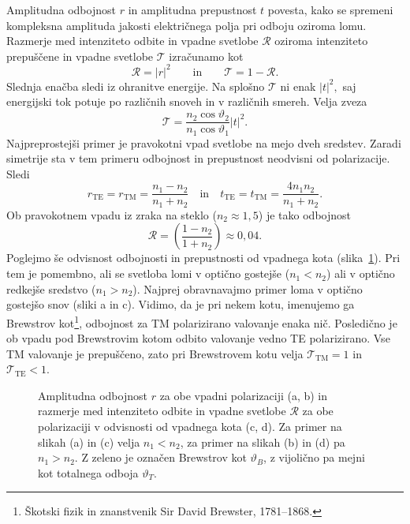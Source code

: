 Amplitudna odbojnost $r$ in amplitudna prepustnost $t$ povesta, kako se spremeni 
kompleksna amplituda jakosti električnega polja pri odboju oziroma lomu.
Razmerje med intenziteto odbite in vpadne svetlobe $\mathcal{R}$ oziroma intenziteto
prepuščene in vpadne svetlobe
$\mathcal{T}$ izračunamo kot 
\begin{equation}
\mathcal{R}=\left|r\right|^{2} \qquad \mathrm{in} \qquad \mathcal{T}=1-\mathcal{R}.
\end{equation}
Slednja enačba sledi iz ohranitve energije. Na splošno $\mathcal{T}$
ni enak $\left|t\right|^{2},$ saj energijski tok potuje po različnih
snoveh in v različnih smereh. Velja zveza
\begin{equation}
\mathcal{T}=\frac{n_{2}\cos\vartheta_{2}}{n_{1}\cos\vartheta_{1}}\left|t\right|^{2}.
\end{equation}
Najpreprostejši primer je pravokotni vpad svetlobe na mejo dveh sredstev. Zaradi simetrije 
sta v tem primeru odbojnost in prepustnost neodvisni od polarizacije. Sledi 
\begin{equation}
r_{\mathrm{TE}} = r_{\mathrm{TM}} = \frac{n_1-n_2}{n_1+n_2}
\quad \mathrm{in} \quad 
t_{\mathrm{TE}} = t_{\mathrm{TM}} = \frac{4n_1n_2}{n_1+n_2}. 
\end{equation}
Ob pravokotnem vpadu iz zraka na steklo ($n_2 \approx 1,5$) je tako odbojnost 
\begin{equation}
\mathcal{R} = \left(\frac{1-n_2}{1+n_2}\right) \approx 0,04.
\end{equation}
Poglejmo še odvisnost odbojnosti in prepustnosti od vpadnega kota (slika~\ref{fig:Brewster}). 
Pri tem je pomembno, ali se svetloba lomi v optično gostejše ($n_1<n_2$) ali v optično
redkejše sredstvo ($n_1>n_2$). Najprej obravnavajmo primer loma v optično gostejšo snov 
(sliki a in c). Vidimo, da je pri nekem kotu, imenujemo ga Brewstrov 
kot\footnote{Škotski fizik in znanstvenik Sir David Brewster, 1781--1868.}, odbojnost 
za TM polarizirano valovanje enaka nič. Posledično je ob vpadu pod Brewstrovim kotom 
odbito valovanje vedno TE polarizirano. Vse TM valovanje je prepuščeno, zato 
pri Brewstrovem kotu velja $\mathcal{T}_\mathrm{TM}=1$ in $\mathcal{T}_\mathrm{TE}<1$.
\begin{figure}[h]
\centering
  \def\svgwidth{140truemm} 
  
\caption{Amplitudna odbojnost $r$ za obe vpadni polarizaciji (a, b) in razmerje med 
intenziteto odbite in vpadne svetlobe $\mathcal{R}$ za obe polarizaciji v odvisnosti 
od vpadnega kota (c, d). Za primer na slikah (a) in (c) velja $n_1<n_2$, za primer na 
slikah (b) in (d) pa $n_1>n_2$. Z zeleno je označen Brewstrov kot $\vartheta_B$, 
z vijolično pa mejni kot totalnega odboja $\vartheta_T$.}
\label{fig:Brewster}
\end{figure}

